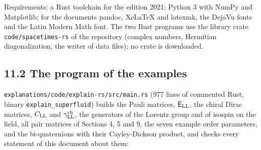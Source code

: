 \documentclass[
  10pt,
]{article}
\begin{document}
Requirements: a Rust toolchain for the edition 2021; Python 3 with NumPy
and Matplotlib; for the documents pandoc, XeLaTeX and latexmk, the
DejaVu fonts and the Latin Modern Math font. The two Rust programs use
the library crate \texttt{code/spacetimes-rs} of the repository (complex
numbers, Hermitian diagonalization, the writer of data files); no crate
is downloaded.

\hypertarget{the-program-of-the-examples}{%
\subsection{11.2 The program of the
examples}\label{the-program-of-the-examples}}

\texttt{explanations/code/explain-rs/src/main.rs} (977 lines of
commented Rust, binary \texttt{explain\_superfluid}) builds the Pauli
matrices, \(\mathsf E_{\rm LL}\), the chiral Dirac matrices,
\(C_{\rm LL}\) and \(\gamma^{\rm ch}_{\rm LL}\), the generators of the
Lorentz group and of isospin on the field, all pair matrices of Sections
4, 5 and 9, the seven example order parameters, and the bi-quaternions
with their Cayley-Dickson product, and checks every statement of this
document about them:
\end{document}
